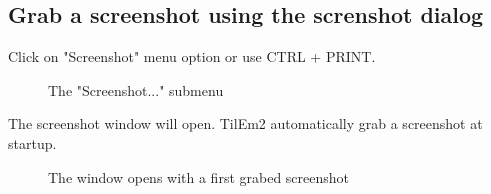 \documentclass[10pt]{report}
\begin{document}
\subsection{Grab a screenshot using the screnshot dialog}

Click on "Screenshot" menu option or use CTRL + PRINT.\newline
\begin{figure}[H]
\centering
{}
\caption{The "Screenshot..." submenu}
\end{figure}

The screenshot window will open.\newline
TilEm2 automatically grab a screenshot at startup.\newline
\begin{figure}[H]
\centering
{}
\caption{The window opens with a first grabed screenshot}
\end{figure}
\end{document}
